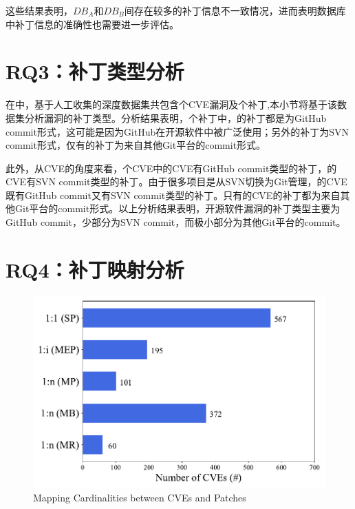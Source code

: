 这些结果表明，$DB_A$和$DB_B$间存在较多的补丁信息不一致情况，进而表明数据库中补丁信息的准确性也需要进一步评估。


\section{RQ3：补丁类型分析}\label{sec:type}

在中，基于人工收集的深度数据集共包含个CVE漏洞及个补丁,本小节将基于该数据集分析漏洞的补丁类型。分析结果表明，个补丁中，的补丁都是为GitHub commit形式，这可能是因为GitHub在开源软件中被广泛使用；另外的补丁为SVN commit形式，仅有的补丁为来自其他Git平台的commit形式。

此外，从CVE的角度来看，个CVE中的CVE有GitHub commit类型的补丁，的CVE有SVN commit类型的补丁。由于很多项目是从SVN切换为Git管理，的CVE既有GitHub commit又有SVN commit类型的补丁。只有的CVE的补丁都为来自其他Git平台的commit形式。以上分析结果表明，开源软件漏洞的补丁类型主要为GitHub commit，少部分为SVN commit，而极小部分为其他Git平台的commit。

\section{RQ4：补丁映射分析}\label{sec:cardinality}
\begin{figure}[h]
\centering
\includegraphics[scale=0.68]{res/rq4-cardinality.pdf}
\vspace{-10pt}
\caption{Mapping Cardinalities between CVEs and Patches}\label{fig:rq4-cardinality}
\end{figure}


